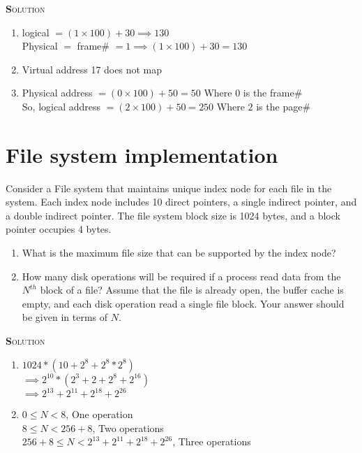 \documentclass{article}
\newcommand{\smallcaps}[1]{\textsc{\textbf #1}\\}
\begin{document}
\begin{multicols}{2}
    \smallcaps{Solution}

    \begin{enumerate}
      \item logical $= (1 \times 100) + 30 \implies 130$ \\
        Physical $=$ frame\# $= 1 \implies (1 \times 100) + 30 = 130$
      \item Virtual address 17 does not map
      \item Physical address $= (0 \times 100) + 50 = 50$ Where $0$ is the frame\# \\
        So, logical address $= (2 \times 100) + 50 = 250$ Where $2$ is the page\#
    \end{enumerate}

    \section*{File system implementation}
    Consider a File system that maintains unique index node for each
    file in the system. Each index node includes 10 direct pointers, a single indirect pointer,
    and a double indirect pointer. The file system block size is 1024 bytes, and a block pointer
    occupies 4 bytes.

    \begin{enumerate}
      \item What is the maximum file size that can be supported by the index node?
      \item How many disk operations will be required if a process read data from the $N^{th}$ block
        of a file? Assume that the file is already open, the buffer cache is empty, and each disk
        operation read a single file block. Your answer should be given in terms of $N$.
    \end{enumerate}

    \smallcaps{Solution}

    \begin{enumerate}
      \item $1024 * (10 + 2^8 + 2^8 * 2^8)$ \\
        $\implies 2^{10} * (2^3 + 2 + 2^8 + 2^{16})$ \\
        $\implies 2^{13} + 2^{11} + 2^{18} + 2^{26}$ \\
      \item $0 \le N < 8$, One operation \\
        $8 \le N < 256 + 8$, Two operations \\
        $256 + 8 \le N < 2^{13} + 2^{11} + 2^{18} + 2^{26}$, Three operations
    \end{enumerate}


\end{multicols}
\end{document}
